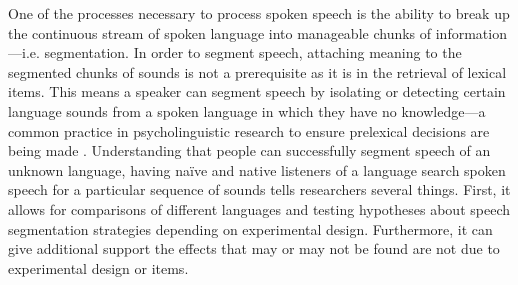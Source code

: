 One of the processes necessary to process spoken speech is the ability to break up the continuous stream of spoken language into manageable chunks of information—i.e. segmentation. In order to segment speech, attaching meaning to the segmented chunks of sounds is not a prerequisite as it is in the retrieval of lexical items. This means a speaker can segment speech by isolating or detecting certain language sounds from a spoken language in which they have no knowledge—a common practice in psycholinguistic research to ensure prelexical decisions are being made \parencite{Cutler1986-zl}. Understanding that people can successfully segment speech of an unknown language, having naïve and native listeners of a language search spoken speech for a particular sequence of sounds tells researchers several things. First, it allows for comparisons of different languages and testing hypotheses about speech segmentation strategies depending on experimental design. Furthermore, it can give additional support the effects that may or may not be found are not due to experimental design or items.
